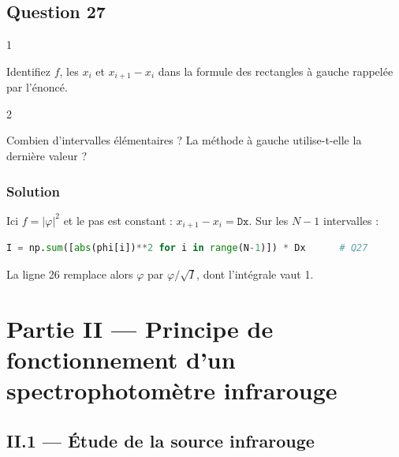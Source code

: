 \documentclass[11pt,a4paper]{article}
\newcommand{\equationajustee}[1]{%
  \sbox{\boiteequation}{$\displaystyle #1$}%
  \ifdim\wd\boiteequation>\linewidth
    \[\resizebox{\linewidth}{!}{\usebox{\boiteequation}}\]%
  \else
    \[#1\]%
  \fi}
\begin{document}
\hypertarget{question-27}{%
\subsection{Question 27}\label{question-27}}

\begin{indication}{1}

Identifiez \(f\), les \(x_i\) et \(x_{i+1} - x_i\) dans la formule des rectangles à gauche rappelée par l'énoncé.

\end{indication}

\begin{indication}{2}

Combien d'intervalles élémentaires ? La méthode à gauche utilise-t-elle la dernière valeur ?

\end{indication}

\hypertarget{solution-26}{%
\subsubsection{Solution}\label{solution-26}}

Ici \(f = |\varphi|^2\) et le pas est constant : \(x_{i+1} - x_i = \mathtt{Dx}\). Sur les \(N - 1\) intervalles :

\equationajustee{\begin{aligned}
K &\approx \sum_{i=0}^{N-2}\mathtt{Dx}\,|\varphi_i|^2 \\
&= \mathtt{Dx}\sum_{i=0}^{N-2}|\varphi_i|^2
\end{aligned}}

\begin{lstlisting}[language=Python]
    I = np.sum([abs(phi[i])**2 for i in range(N-1)]) * Dx      # Q27
\end{lstlisting}

La ligne 26 remplace alors \(\varphi\) par \(\varphi/\sqrt{I}\), dont l'intégrale vaut 1.

\hypertarget{partie-ii-principe-de-fonctionnement-dun-spectrophotomuxe8tre-infrarouge}{%
\section{Partie II --- Principe de fonctionnement d'un spectrophotomètre infrarouge}\label{partie-ii-principe-de-fonctionnement-dun-spectrophotomuxe8tre-infrarouge}}

\hypertarget{ii.1-uxe9tude-de-la-source-infrarouge}{%
\subsection{II.1 --- Étude de la source infrarouge}\label{ii.1-uxe9tude-de-la-source-infrarouge}}
\end{document}
